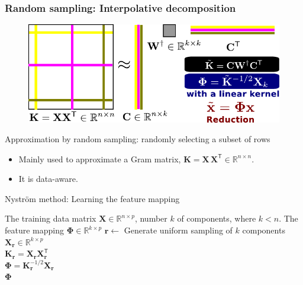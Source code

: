 \documentclass{beamer}
\begin{document}
\begin{frame}

\frametitle{\textbf{Random sampling:} Interpolative decomposition}
\begin{figure}
\centering
\includegraphics[width=0.75\linewidth]{figures/nystroem.pdf}
\end{figure}

Approximation by random sampling: randomly selecting a subset of rows
\begin{itemize}
    \item Mainly used to approximate a Gram matrix, $\mathbf{K} = 
    \mathbf{X}\,\mathbf{X}^\mathsf{T} \in \mathbb{R}^{n\times n}$.
    \item It is data-aware.
\end{itemize}
\end{frame}

\begin{frame}
\begin{algorithm}[H]
\caption{Nystr\"om method: Learning the feature mapping}
\begin{algorithmic}[1]
\REQUIRE The training data matrix $\mathbf{X} \in \mathbb{R}^{n\times p}$, 
number $k$ of 
components, where $k < n$.
\ENSURE The feature mapping $\mathbf{\Phi} \in \mathbb{R}^{k\times p}$ 
\STATE $\mathbf{r} \leftarrow$ Generate uniform sampling of $k$ components\\
\STATE $\mathbf{X}_{\mathbf{r}} \in \mathbb{R}^{k\times p}$ \\
\STATE $\mathbf{K}_{\mathbf{r}} = \mathbf{X}_\mathbf{r} 
\mathbf{X}_\mathbf{r}^\mathsf{T}$ \\
\STATE $\mathbf{\Phi} = \mathbf{K}_\mathbf{r}^{-1/2} \mathbf{X}_\mathbf{r}$ 
\\
\RETURN $\mathbf{\Phi}$
\end{algorithmic}
\end{algorithm}

\end{frame}
\end{document}
